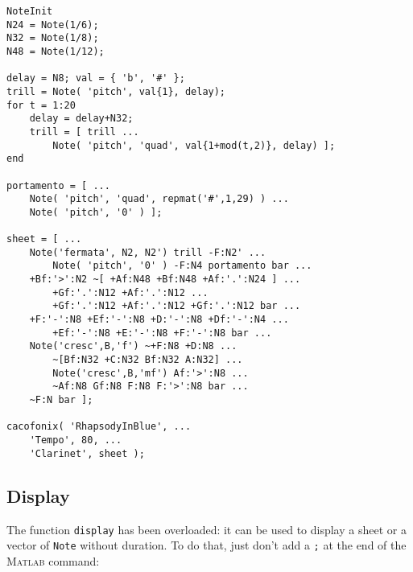 \documentclass{article}
\newcommand{\matlab}{\textsc{Matlab}\xspace}
\newcommand{\note}{\lstinline!Note!\xspace}
\begin{document}
\begin{lstlisting}
NoteInit
N24 = Note(1/6);
N32 = Note(1/8);
N48 = Note(1/12);

delay = N8; val = { 'b', '#' };
trill = Note( 'pitch', val{1}, delay);
for t = 1:20
	delay = delay+N32;
	trill = [ trill ...
		Note( 'pitch', 'quad', val{1+mod(t,2)}, delay) ];
end

portamento = [ ...
	Note( 'pitch', 'quad', repmat('#',1,29) ) ...
	Note( 'pitch', '0' ) ];

sheet = [ ...
	Note('fermata', N2, N2') trill -F:N2' ...
		Note( 'pitch', '0' ) -F:N4 portamento bar ...
	+Bf:'>':N2 ~[ +Af:N48 +Bf:N48 +Af:'.':N24 ] ...
		+Gf:'.':N12 +Af:'.':N12 ...
		+Gf:'.':N12 +Af:'.':N12 +Gf:'.':N12 bar ...
	+F:'-':N8 +Ef:'-':N8 +D:'-':N8 +Df:'-':N4 ...
		+Ef:'-':N8 +E:'-':N8 +F:'-':N8 bar ...
	Note('cresc',B,'f') ~+F:N8 +D:N8 ...
		~[Bf:N32 +C:N32 Bf:N32 A:N32] ...
		Note('cresc',B,'mf') Af:'>':N8 ...
		~Af:N8 Gf:N8 F:N8 F:'>':N8 bar ...
	~F:N bar ];

cacofonix( 'RhapsodyInBlue', ...
	'Tempo', 80, ...
	'Clarinet', sheet );
\end{lstlisting}

\subsection{Display}
\label{sec:Display}

The function \lstinline!display! has been overloaded: it can be used to display a sheet or a vector of \note without duration. To do that, just don't add a \lstinline!;! at the end of the \matlab command: \\
\end{document}
